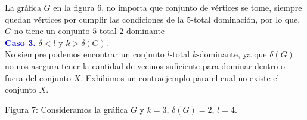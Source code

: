 \documentclass{article}
\begin{document}
 La gráfica $G$ en la figura $6$, no importa que conjunto de vértices se tome, siempre quedan vértices por cumplir las condiciones de la $5$-total dominación, por lo que, $G$ no tiene un conjunto $5$-total $2$-dominante\\


\textcolor{blue}{\textbf{Caso 3.}} $\delta < l$ y $k > \delta(G)$.\\
No siempre podemos encontrar un conjunto $l$-total $k$-dominante, ya que $\delta(G)$ no nos asegura tener la cantidad de vecinos suficiente para dominar dentro o fuera del conjunto $X$. Exhibimos un contraejemplo para el cual no existe el conjunto $X$.\\


\begin{center}

\vspace{0.5cm}

Figura 7: \small{Consideramos la gráfica $G$ y $k=3$, $\delta(G)=2$, $l=4$.}

\end{center}
\end{document}
